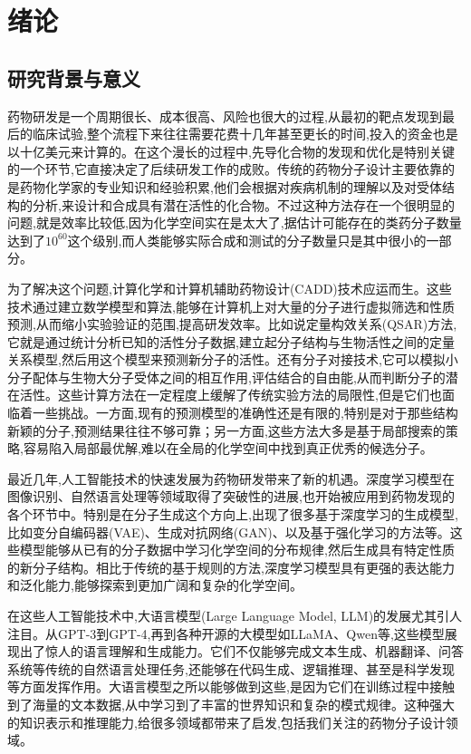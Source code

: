 \chapter{绪论}

\section{研究背景与意义}

药物研发是一个周期很长、成本很高、风险也很大的过程,从最初的靶点发现到最后的临床试验,整个流程下来往往需要花费十几年甚至更长的时间,投入的资金也是以十亿美元来计算的。在这个漫长的过程中,先导化合物的发现和优化是特别关键的一个环节,它直接决定了后续研发工作的成败。传统的药物分子设计主要依靠的是药物化学家的专业知识和经验积累,他们会根据对疾病机制的理解以及对受体结构的分析,来设计和合成具有潜在活性的化合物。不过这种方法存在一个很明显的问题,就是效率比较低,因为化学空间实在是太大了,据估计可能存在的类药分子数量达到了$10^{60}$这个级别,而人类能够实际合成和测试的分子数量只是其中很小的一部分。

为了解决这个问题,计算化学和计算机辅助药物设计(CADD)技术应运而生。这些技术通过建立数学模型和算法,能够在计算机上对大量的分子进行虚拟筛选和性质预测,从而缩小实验验证的范围,提高研发效率。比如说定量构效关系(QSAR)方法,它就是通过统计分析已知的活性分子数据,建立起分子结构与生物活性之间的定量关系模型,然后用这个模型来预测新分子的活性。还有分子对接技术,它可以模拟小分子配体与生物大分子受体之间的相互作用,评估结合的自由能,从而判断分子的潜在活性。这些计算方法在一定程度上缓解了传统实验方法的局限性,但是它们也面临着一些挑战。一方面,现有的预测模型的准确性还是有限的,特别是对于那些结构新颖的分子,预测结果往往不够可靠；另一方面,这些方法大多是基于局部搜索的策略,容易陷入局部最优解,难以在全局的化学空间中找到真正优秀的候选分子。

最近几年,人工智能技术的快速发展为药物研发带来了新的机遇。深度学习模型在图像识别、自然语言处理等领域取得了突破性的进展,也开始被应用到药物发现的各个环节中。特别是在分子生成这个方向上,出现了很多基于深度学习的生成模型,比如变分自编码器(VAE)、生成对抗网络(GAN)、以及基于强化学习的方法等。这些模型能够从已有的分子数据中学习化学空间的分布规律,然后生成具有特定性质的新分子结构。相比于传统的基于规则的方法,深度学习模型具有更强的表达能力和泛化能力,能够探索到更加广阔和复杂的化学空间。

在这些人工智能技术中,大语言模型(Large Language Model, LLM)的发展尤其引人注目。从GPT-3到GPT-4,再到各种开源的大模型如LLaMA、Qwen等,这些模型展现出了惊人的语言理解和生成能力。它们不仅能够完成文本生成、机器翻译、问答系统等传统的自然语言处理任务,还能够在代码生成、逻辑推理、甚至是科学发现等方面发挥作用。大语言模型之所以能够做到这些,是因为它们在训练过程中接触到了海量的文本数据,从中学习到了丰富的世界知识和复杂的模式规律。这种强大的知识表示和推理能力,给很多领域都带来了启发,包括我们关注的药物分子设计领域。

